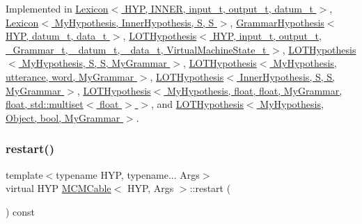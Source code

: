 Implemented in \hyperlink{class_lexicon_afa8ea51bbd16df5f46557fe10db84980}{Lexicon$<$ H\+Y\+P, I\+N\+N\+E\+R, input\+\_\+t, output\+\_\+t, datum\+\_\+t $>$}, \hyperlink{class_lexicon_afa8ea51bbd16df5f46557fe10db84980}{Lexicon$<$ My\+Hypothesis, Inner\+Hypothesis, S, S $>$}, \hyperlink{class_grammar_hypothesis_aab60215dfe06a059389db9c7f95e9ce7}{Grammar\+Hypothesis$<$ H\+Y\+P, datum\+\_\+t, data\+\_\+t $>$}, \hyperlink{class_l_o_t_hypothesis_a9a03abc8a6d96995c0f13524f8500747}{L\+O\+T\+Hypothesis$<$ H\+Y\+P, input\+\_\+t, output\+\_\+t, \+\_\+\+Grammar\+\_\+t, \+\_\+datum\+\_\+t, \+\_\+data\+\_\+t, Virtual\+Machine\+State\+\_\+t $>$}, \hyperlink{class_l_o_t_hypothesis_a9a03abc8a6d96995c0f13524f8500747}{L\+O\+T\+Hypothesis$<$ My\+Hypothesis, S, S, My\+Grammar $>$}, \hyperlink{class_l_o_t_hypothesis_a9a03abc8a6d96995c0f13524f8500747}{L\+O\+T\+Hypothesis$<$ My\+Hypothesis, utterance, word, My\+Grammar $>$}, \hyperlink{class_l_o_t_hypothesis_a9a03abc8a6d96995c0f13524f8500747}{L\+O\+T\+Hypothesis$<$ Inner\+Hypothesis, S, S, My\+Grammar $>$}, \hyperlink{class_l_o_t_hypothesis_a9a03abc8a6d96995c0f13524f8500747}{L\+O\+T\+Hypothesis$<$ My\+Hypothesis, float, float, My\+Grammar, float, std\+::multiset$<$ float $>$ $>$}, and \hyperlink{class_l_o_t_hypothesis_a9a03abc8a6d96995c0f13524f8500747}{L\+O\+T\+Hypothesis$<$ My\+Hypothesis, Object, bool, My\+Grammar $>$}.

\mbox{\label{class_m_c_m_cable_a220d6c4ca73e20441c14fa5bd3e090d3}} 
\subsubsection{\texorpdfstring{restart()}{restart()}}
{\footnotesize\ttfamily template$<$typename H\+YP, typename... Args$>$ \\
virtual H\+YP \hyperlink{class_m_c_m_cable}{M\+C\+M\+Cable}$<$ H\+YP, Args $>$\+::restart (\begin{DoxyParamCaption}{ }\end{DoxyParamCaption}) const\hspace{0.3cm}{\ttfamily [pure virtual]}}



